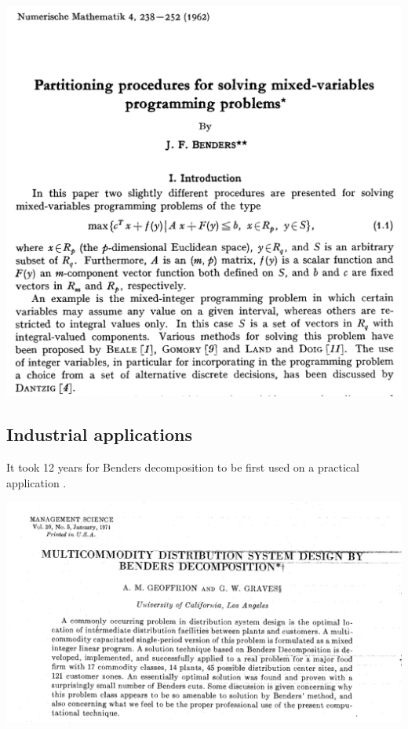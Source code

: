 \begin{center}
\includegraphics[width=14cm]{fig//fig1}
\end{center}


\newpage

\subsection*{Industrial applications}


It took 12 years for Benders decomposition to be first used on a practical application  \cite{geoffrion74multicommodity}. 


\begin{center}
\includegraphics[width=14cm]{fig//fig2}
\end{center}


